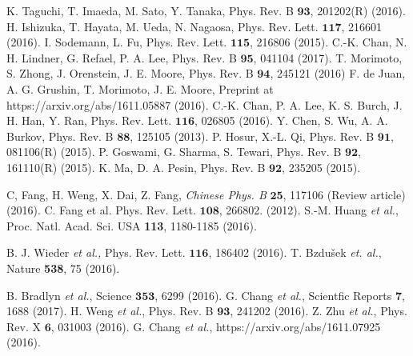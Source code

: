 \documentclass[aps,prl,superscriptaddress,twocolumn,showpacs]{revtex4-1}
\begin{document}
\begin{thebibliography}{99}
 K. Taguchi, T. Imaeda, M. Sato, Y. Tanaka, Phys. Rev. B $\mathbf{93}$, 201202(R) (2016).
 H. Ishizuka, T. Hayata, M. Ueda, N. Nagaosa, Phys. Rev. Lett. $\mathbf{117}$, 216601 (2016).
 I. Sodemann, L. Fu, Phys. Rev. Lett. $\mathbf{115}$, 216806 (2015).
 C.-K. Chan, N. H. Lindner, G. Refael, P. A. Lee, Phys. Rev. B $\mathbf{95}$, 041104 (2017).
 T. Morimoto, S. Zhong, J. Orenstein, J. E. Moore, Phys. Rev. B $\mathbf{94}$, 245121 (2016)
 F. de Juan, A. G. Grushin, T. Morimoto, J. E. Moore, Preprint at https://arxiv.org/abs/1611.05887 (2016).
 C.-K. Chan, P. A. Lee, K. S. Burch, J. H. Han, Y. Ran, Phys. Rev. Lett. $\mathbf{116}$, 026805 (2016).
 Y. Chen, S. Wu, A. A. Burkov, Phys. Rev. B $\mathbf{88}$, 125105 (2013).
 P. Hosur, X.-L. Qi, Phys. Rev. B $\mathbf{91}$, 081106(R) (2015).
 P. Goswami, G. Sharma, S. Tewari, Phys. Rev. B $\mathbf{92}$, 161110(R) (2015).
 K. Ma, D. A. Pesin, Phys. Rev. B $\mathbf{92}$, 235205 (2015).




 C, Fang, H. Weng, X. Dai, Z. Fang, \textit{Chinese Phys. B} $\mathbf{25}$, 117106 (Review article) (2016).
 C. Fang et al. Phys. Rev. Lett. $\mathbf{108}$, 266802. (2012).
 S.-M. Huang \textit{et al.}, Proc. Natl. Acad. Sci. USA \textbf{113}, 1180-1185 (2016).

 B. J. Wieder \textit{et al.,} Phys. Rev. Lett. $\mathbf{116}$, 186402 (2016).
 T. Bzdu{\v s}ek \textit{et. al.}, Nature \textbf{538}, 75 (2016).

 B. Bradlyn \textit{et al.}, Science $\mathbf{353}$, 6299 (2016).
 G. Chang \textit{et al.}, Scientfic Reports $\mathbf{7}$, 1688 (2017).
 H. Weng \textit{et al.}, Phys. Rev. B $\mathbf{93}$, 241202 (2016).
 Z. Zhu \textit{et al.}, Phys. Rev. X $\mathbf{6}$, 031003 (2016).
 G. Chang \textit{et al.}, https://arxiv.org/abs/1611.07925 (2016).





\end{thebibliography}
\end{document}
